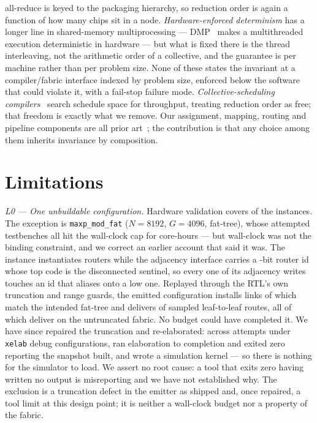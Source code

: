 \documentclass[journal,10pt]{IEEEtran}
\theoremstyle{plain}
\theoremstyle{definition}
\theoremstyle{remark}
\newcommand{\sv}[1]{\texttt{#1}}
\begin{document}
all-reduce is keyed to the packaging hierarchy, so reduction order is again a
function of how many chips sit in a node. \emph{Hardware-enforced determinism} has a longer
line in shared-memory multiprocessing --- DMP~\cite{devietti2009dmp} makes a
multithreaded execution deterministic in hardware --- but what is fixed there
is the thread interleaving, not the arithmetic order of a collective, and the
guarantee is per machine rather than per problem size. None of these states the
invariant at a compiler/fabric interface indexed by problem size, enforced
below the software that could violate it, with a fail-stop failure mode.
\emph{Collective-scheduling
compilers}~\cite{cai2021synthesizing,shah2023taccl,thakur2005optimization,%
rabenseifner2004optimization} search schedule space for throughput, treating
reduction order as free; that freedom is exactly what we remove. Our
assignment, mapping, routing and pipeline components are all prior
art~\cite{topcuoglu2002heft,lukes1974efficient,dally2004principles}; the
contribution is that any choice among them inherits invariance by composition.


\section{Limitations}\label{sec:limitations}

\emph{L0 --- One unbuildable configuration.} Hardware validation covers
\TournNInst{} of the \SuiteSize{} instances. The exception is
\sv{maxp\_mod\_fat} ($N{=}8192$, $G{=}4096$, fat-tree), whose
\MaxpAttempts{} attempted testbenches all hit the wall-clock cap for
\MaxpCoreHours{} core-hours --- but wall-clock was not the binding constraint,
and we correct an earlier account that said it was. The instance instantiates
\MaxpRouters{} routers while the adjacency interface carries a
\RouterIdBits-bit router id whose top code is the disconnected sentinel, so
every one of its \MaxpAdjEntries{} adjacency writes touches an id that aliases
onto a low one. Replayed through the RTL's own truncation and range guards,
the emitted configuration installs \MaxpLinksInstalled{} links of which
\MaxpLinksCorrect{} match the intended fat-tree and delivers
\MaxpRoutesDelivered{} of \MaxpRoutesSampled{} sampled leaf-to-leaf routes,
all \MaxpRoutesSampled{} of which deliver on the untruncated fabric. No budget
could have completed it. We have since repaired the truncation and
re-elaborated: across \MaxpElabAttempts{} attempts under \MaxpDebugCfgs{}
\sv{xelab} debug configurations, \MaxpElabClean{} ran elaboration to
completion and exited zero reporting the snapshot built, and \MaxpKernels{}
wrote a simulation kernel --- so there is nothing for the simulator to load.
We assert no root cause: a tool that exits zero having written no output is
misreporting and we have not established why. The exclusion is a truncation
defect in the emitter as shipped and, once repaired, a tool limit at this
design point; it is neither a wall-clock budget nor a property of the fabric.
\end{document}
